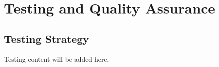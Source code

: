 \chapter{Testing and Quality Assurance}
\section{Testing Strategy}
Testing content will be added here.
